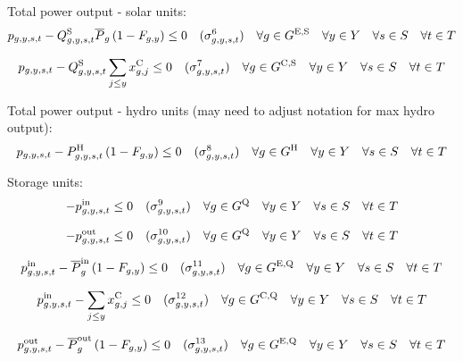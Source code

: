 \documentclass{article}
\newcommand{\sScenarioSets}{\quad \forall \iYear \in \sYears \quad \forall \iScenario \in \sScenarios \quad \forall \iInterval \in \sIntervals}
\begin{document}
Total power output - solar units:
\begin{equation}
	\vPower - \cCapacityFactorSolar \cPowerOutputMax[\iGenerator] \left(1 - \cRetirementIndicator\right) \leq 0 \quad (\dMaxPowerOutputSolarExisting) \quad \forall \iGenerator \in \sGeneratorsExistingSolar \sScenarioSets
\end{equation}

\begin{equation}
	\vPower - \cCapacityFactorSolar \sum\limits_{\iYearAlias \leq \iYear} \vInstalledCapacity[\iGenerator,\iYearAlias] \leq 0 \quad (\dMaxPowerOutputSolarCandidate) \quad \forall \iGenerator \in \sGeneratorsCandidateSolar \sScenarioSets
\end{equation}

Total power output - hydro units (may need to adjust notation for max hydro output):
\begin{equation}
	\vPower - \cPowerOutputHydro \left(1 - \cRetirementIndicator\right) \leq 0 \quad (\dMaxPowerOutputHydro) \quad \forall \iGenerator \in \sGeneratorsHydro \sScenarioSets
\end{equation}

Storage units:
\begin{equation}
	-\vPowerIn \leq 0 \quad (\dNonNegativeCharging) \quad \forall \iGenerator \in \sStorage \sScenarioSets
\end{equation}

\begin{equation}
	-\vPowerOut \leq 0 \quad (\dNonNegativeDischarging) \quad \forall \iGenerator \in \sStorage \sScenarioSets
\end{equation}

\begin{equation}
	\vPowerIn - \cPowerChargingMax \left(1 - \cRetirementIndicator\right) \leq 0 \quad (\dMaxChargingRateExisting) \quad \forall \iGenerator \in \sStorageExisting \sScenarioSets
\end{equation}

\begin{equation}
	\vPowerIn - \sum\limits_{\iYearAlias \leq \iYear} \vInstalledCapacity[\iGenerator,\iYearAlias] \leq 0 \quad (\dMaxChargingRateCandidate) \quad \forall \iGenerator \in \sStorageCandidate \sScenarioSets
\end{equation}

\begin{equation}
	\vPowerOut - \cPowerDischargingMax \left(1 - \cRetirementIndicator\right) \leq 0 \quad (\dMaxDischargingRateExisting) \quad \forall \iGenerator \in \sStorageExisting \sScenarioSets
\end{equation}
\end{document}
